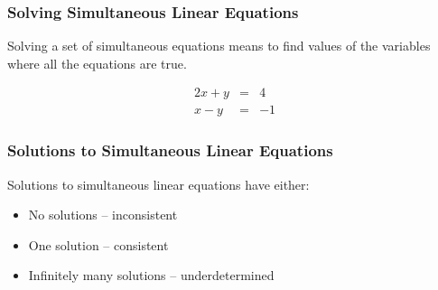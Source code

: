 \documentclass{beamer}
\begin{document}
\begin{frame}[fragile]
  \frametitle{Solving Simultaneous Linear Equations}

Solving a set of simultaneous equations means to find values of the variables where all the equations are true.

\begin{eqnarray*}
2x  +   y   &=&   4 \\
x   -   y   &=&   -1
\end{eqnarray*}

\medskip


\begin{center}


\end{center}


\end{frame}

\begin{frame}
  \frametitle{Solutions to Simultaneous Linear Equations}

Solutions to simultaneous linear equations have either:

\begin{itemize}
 \item No solutions -- inconsistent
 \item One solution -- consistent
 \item Infinitely many solutions -- underdetermined
\end{itemize}

\end{frame}
\end{document}
